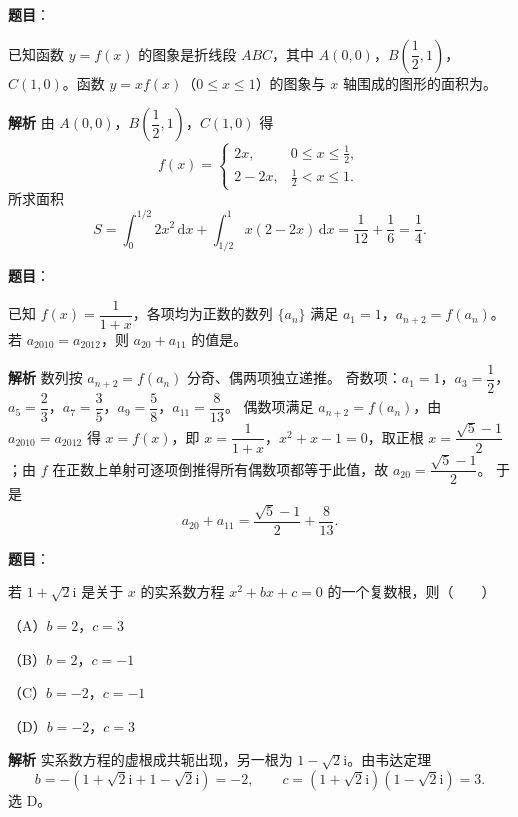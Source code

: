 \begin{answer}

\textbf{题目}：

已知函数 $y=f(x)$ 的图象是折线段 $ABC$，其中 $A(0,0)$，$B\left(\dfrac12,1\right)$，$C(1,0)$。函数 $y=xf(x)$（$0\leqslant x\leqslant1$）的图象与 $x$ 轴围成的图形的面积为\gkblank{}。

\textbf{解析}
由 $A(0,0)$，$B\left(\dfrac12,1\right)$，$C(1,0)$ 得
\nopagebreak[4]
\[f(x)=\begin{cases}2x,&0\leqslant x\leqslant\frac12,\\ 2-2x,&\frac12<x\leqslant1.\end{cases}\]
所求面积
\nopagebreak[4]
\[S=\int_0^{1/2}2x^2\,\mathrm dx+\int_{1/2}^1x(2-2x)\,\mathrm dx=\frac1{12}+\frac16=\frac14.\]


\end{answer}
\begin{answer}

\textbf{题目}：

已知 $f(x)=\dfrac1{1+x}$，各项均为正数的数列 $\{a_n\}$ 满足 $a_1=1$，$a_{n+2}=f(a_n)$。若 $a_{2010}=a_{2012}$，则 $a_{20}+a_{11}$ 的值是\gkblank{}。

\textbf{解析}
数列按 $a_{n+2}=f(a_n)$ 分奇、偶两项独立递推。
奇数项：$a_1=1$，$a_3=\dfrac12$，$a_5=\dfrac23$，$a_7=\dfrac35$，$a_9=\dfrac58$，$a_{11}=\dfrac8{13}$。
偶数项满足 $a_{n+2}=f(a_n)$，由 $a_{2010}=a_{2012}$ 得 $x=f(x)$，即 $x=\dfrac1{1+x}$，$x^2+x-1=0$，取正根 $x=\dfrac{\sqrt5-1}2$；由 $f$ 在正数上单射可逐项倒推得所有偶数项都等于此值，故 $a_{20}=\dfrac{\sqrt5-1}2$。
于是
\nopagebreak[4]
\[a_{20}+a_{11}=\frac{\sqrt5-1}2+\frac8{13}.\]


\end{answer}
\begin{answer}

\textbf{题目}：

若 $1+\sqrt2\mathrm i$ 是关于 $x$ 的实系数方程 $x^2+bx+c=0$ 的一个复数根，则\mbox{（　　）}

（A）$b=2$，$c=3$

（B）$b=2$，$c=-1$

（C）$b=-2$，$c=-1$

（D）$b=-2$，$c=3$

\textbf{解析}
实系数方程的虚根成共轭出现，另一根为 $1-\sqrt2\mathrm i$。由韦达定理
\nopagebreak[4]
\[b=-(1+\sqrt2\mathrm i+1-\sqrt2\mathrm i)=-2,\qquad c=(1+\sqrt2\mathrm i)(1-\sqrt2\mathrm i)=3.\]
选 D。


\end{answer}
